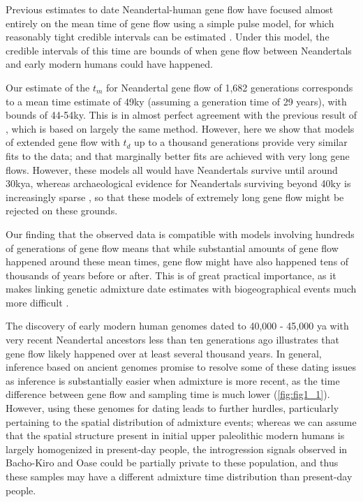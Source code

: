 \documentclass[11pt]{article}
\begin{document}
Previous estimates to date Neandertal-human gene flow have focused almost entirely on the mean time of gene flow using a simple pulse model, for which reasonably tight credible intervals can be estimated \citep{sankararaman_date_2012, moorjani_genetic_2016}. Under this model, the credible intervals of this time are bounds of when gene flow between Neandertals and early modern humans could have happened. 

Our estimate of the $t_m$ for Neandertal gene flow of 1,682 generations corresponds to a mean time estimate of 49ky (assuming a generation time of 29 years), with bounds of 44-54ky. This is in almost perfect agreement with the previous result of \citep{moorjani_genetic_2016}, which is based on largely the same method. However, here we show that models of extended gene flow with $t_d$ up to a thousand generations provide very similar fits to the data; and that marginally better fits are achieved with very long gene flows. However, these models all would have Neandertals survive until around 30kya, whereas archaeological evidence for Neandertals surviving beyond 40ky is increasingly sparse \cite{hublin_last_2017}, so that these models of extremely long gene flow might be rejected on these grounds. 

Our finding that the observed data is compatible with models involving hundreds of generations of gene flow means that while substantial amounts of gene flow happened around these mean times, gene flow might have also happened tens of thousands of years before or after. This is of great practical importance, as it makes linking genetic admixture date estimates with biogeographical events much more difficult \citep{sankararaman_date_2012,lazaridis_genomic_2016,douka_age_2019,jacobs_multiple_2019,vyas_analyses_2019}. 

The discovery of early modern human genomes dated to 40,000 - 45,000 ya with very recent Neandertal ancestors less than ten generations ago \citep{fu_genome_2014, hajdinjak_initial_2021} illustrates that gene flow likely happened over at least several thousand years.  In general, inference based on ancient genomes \citep{fu_genome_2014, fu_early_2015, moorjani_genetic_2016} promise to resolve some of these dating issues as inference is substantially easier when admixture is more recent, as the time difference between gene flow and sampling time is much lower (\ref{fig:fig1_1}). However, using these genomes for dating leads to further hurdles, particularly pertaining to the spatial distribution of admixture events; whereas we can assume that the spatial structure present in initial upper paleolithic modern humans is largely homogenized in present-day people, the introgression signals observed in Bacho-Kiro and Oase could be partially private to these population, and thus these samples may have a different admixture time distribution than present-day people.
\end{document}
